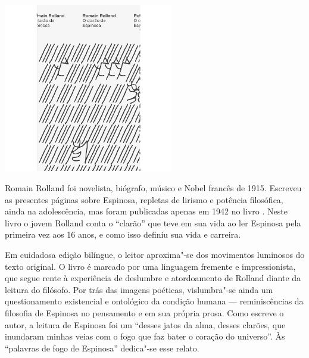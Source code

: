 \vfill

\hspace*{-.4cm}\begin{minipage}[c]{.5\linewidth}
\small{
{}}
\end{minipage}

\pagebreak


\begin{center}
\hspace*{.5cm}\includegraphics[width=74mm]{./grid/rolland.png}
\end{center}

\hspace*{-7cm}\hrulefill\hspace*{-7cm}

\medskip

\noindent{}Romain Rolland foi novelista, biógrafo, músico e Nobel francês de 1915. Escreveu as presentes páginas sobre Espinosa, repletas de lirismo e potência filosófica, ainda na adolescência, mas foram publicadas apenas em 1942 no livro {}. Neste livro o jovem Rolland conta o “clarão” que teve em sua vida ao ler Espinosa pela primeira vez aos 16 anos, e como isso definiu sua vida e carreira.

Em cuidadosa edição bilíngue, o leitor aproxima"-se dos movimentos luminosos do texto original. O livro é marcado por uma linguagem fremente e impressionista, que segue rente à experiência de deslumbre e atordoamento de Rolland diante da leitura do filósofo. Por trás das imagens poéticas, vislumbra"-se ainda um questionamento existencial e ontológico da condição humana --- reminiscências da filosofia de Espinosa no pensamento e em sua própria prosa. Como escreve o autor, a leitura de Espinosa foi um “desses jatos da alma, desses clarões, que inundaram minhas veias com o fogo que faz bater o coração do universo”. Às “palavras de fogo de Espinosa” dedica"-se esse relato.

